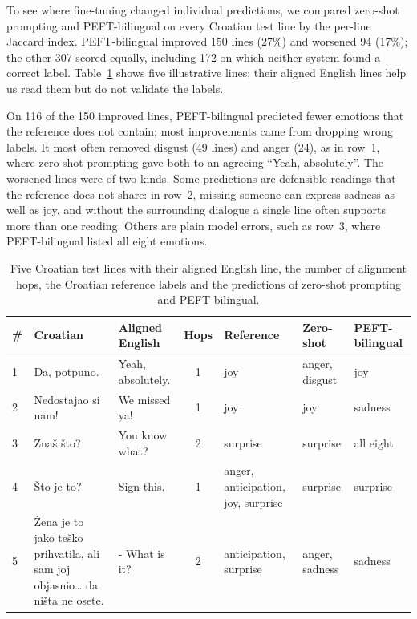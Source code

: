 To see where fine-tuning changed individual predictions, we compared zero-shot prompting and PEFT-bilingual on every Croatian test line by the per-line Jaccard index. PEFT-bilingual improved 150 lines (27\%) and worsened 94 (17\%); the other 307 scored equally, including 172 on which neither system found a correct label. Table~\ref{tab:error-examples} shows five illustrative lines; their aligned English lines help us read them but do not validate the labels.

On 116 of the 150 improved lines, PEFT-bilingual predicted fewer emotions that the reference does not contain; most improvements came from dropping wrong labels. It most often removed disgust (49 lines) and anger (24), as in row~1, where zero-shot prompting gave both to an agreeing ``Yeah, absolutely''. The worsened lines were of two kinds. Some predictions are defensible readings that the reference does not share: in row~2, missing someone can express sadness as well as joy, and without the surrounding dialogue a single line often supports more than one reading. Others are plain model errors, such as row~3, where PEFT-bilingual listed all eight emotions.

\begin{table}[!htbp]
    \centering
    \small
    \caption{Five Croatian test lines with their aligned English line, the number of alignment hops, the Croatian reference labels and the predictions of zero-shot prompting and PEFT-bilingual.}
    \label{tab:error-examples}
    \begin{tabularx}{\textwidth}{l>{\raggedright\arraybackslash}X>{\raggedright\arraybackslash}X c>{\raggedright\arraybackslash}X>{\raggedright\arraybackslash}X>{\raggedright\arraybackslash}X}
        \toprule
        \# & Croatian & Aligned English & Hops & Reference & Zero-shot & PEFT-bilingual \\
        \midrule
        1 & Da, potpuno. & Yeah, absolutely. & 1 & joy & anger, disgust & joy \\
        2 & Nedostajao si nam! & We missed ya! & 1 & joy & joy & sadness \\
        3 & Znaš što? & You know what? & 2 & surprise & surprise & all eight \\
        4 & Što je to? & Sign this. & 1 & anger, anticipation, joy, surprise & surprise & surprise \\
        5 & Žena je to jako teško prihvatila, ali sam joj objasnio\ldots{} da ništa ne osete. & - What is it? & 2 & anticipation, surprise & anger, sadness & sadness \\
        \bottomrule
    \end{tabularx}
\end{table}

